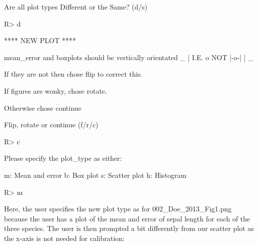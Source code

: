 \documentclass[article]{jss}
\begin{document}
\begin{CodeChunk}
\begin{CodeOutput}
Are all plot types Different or the Same? (d/s)
\end{CodeOutput}
\begin{CodeInput}
R> d
\end{CodeInput}
\begin{CodeOutput}
**** NEW PLOT ****

mean_error and boxplots should be vertically orientated
       _ 
       |  
  I.E. o    NOT  |-o-|
       |
       _

If they are not then chose flip to correct this.

If figures are wonky, chose rotate.

Otherwise chose continue

Flip, rotate or continue (f/r/c) 
\end{CodeOutput}
\begin{CodeInput}
R> c
\end{CodeInput}
\begin{CodeOutput}
Please specify the plot_type as either:

 m: Mean and error
 b: Box plot
 s: Scatter plot 
 h: Histogram
\end{CodeOutput}
\begin{CodeInput}
R> m
\end{CodeInput}
\end{CodeChunk}

Here, the user specifies the new plot type as  for 002\_Doe\_2013\_Fig1.png because the user has a plot of the mean and error of sepal length for each of the three species. The user is then prompted a bit differently from our scatter plot as the x-axis is not needed for calibration:
\end{document}
